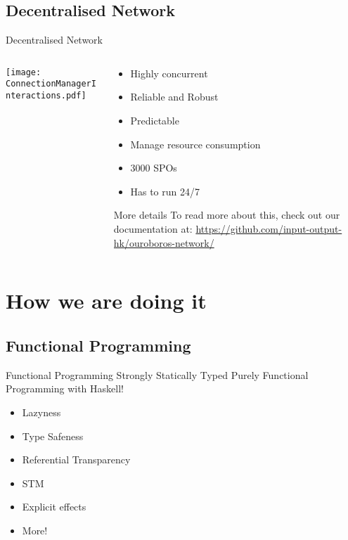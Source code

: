 \documentclass{beamer}
\begin{document}
\subsection*{Decentralised Network}
\begin{frame}{Decentralised Network }
  \begin{columns}
    \begin{column}{0.6\textwidth}
      \vskip0.2cm
      \texttt{[image: ConnectionManagerInteractions.pdf]}
    \end{column}
    \begin{column}{0.4\textwidth}
      \footnotesize
      \begin{itemize}
        \item Highly concurrent
        \item Reliable and Robust
        \item Predictable
        \item Manage resource consumption
        \item 3000 SPOs
        \item Has to run 24/7
      \end{itemize}

      \tiny
      \begin{block}{More details}
        To read more about this, check out our documentation at:
        \href{https://github.com/input-output-hk/ouroboros-network/}{https://github.com/input-output-hk/ouroboros-network/}
      \end{block}

    \end{column}
  \end{columns}
\end{frame}

\section{How we are doing it}

\subsection*{Functional Programming}

\begin{frame}{Functional Programming}
  Strongly Statically Typed Purely Functional Programming with \alert{Haskell}!

  \begin{itemize}
      \item Lazyness
      \item \alert{Type Safeness}
      \item \alert{Referential Transparency}
      \item \alert{STM}
      \item Explicit effects
      \item More!
  \end{itemize}

\end{frame}
\end{document}
